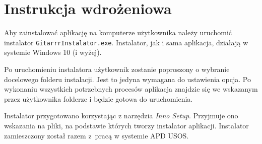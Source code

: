 \chapter{Instrukcja wdrożeniowa}

Aby zainstalować aplikację na komputerze użytkownika należy uruchomić instalator \texttt{GitarrrInstalator.exe}. Instalator, jak i sama aplikacja, działają w systemie Windows 10 (i wyżej). 

Po uruchomieniu instalatora użytkownik zostanie poproszony o wybranie docelowego folderu instalacji. Jest to jedyna wymagana do ustawienia opcja. Po wykonaniu wszystkich potrzebnych procesów aplikacja znajdzie się we wskazanym przez użytkownika folderze i będzie gotowa do uruchomienia.


Instalator przygotowano korzystając z narzędzia \emph{Inno Setup}. Przyjmuje ono wskazania na pliki, na podstawie których tworzy instalator aplikacji. %
Instalator zamieszczony został razem z~pracą w systemie APD USOS.
